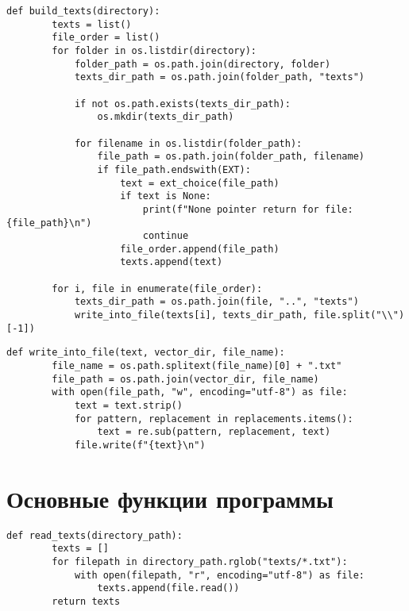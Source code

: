 \begin{lstlisting}[caption={Создание текстовых файлов для всех текстов}]
    def build_texts(directory):
        texts = list()
        file_order = list()
        for folder in os.listdir(directory):
            folder_path = os.path.join(directory, folder)
            texts_dir_path = os.path.join(folder_path, "texts")

            if not os.path.exists(texts_dir_path):
                os.mkdir(texts_dir_path)

            for filename in os.listdir(folder_path):
                file_path = os.path.join(folder_path, filename)
                if file_path.endswith(EXT):
                    text = ext_choice(file_path)
                    if text is None:
                        print(f"None pointer return for file: {file_path}\n")
                        continue
                    file_order.append(file_path)
                    texts.append(text)

        for i, file in enumerate(file_order):
            texts_dir_path = os.path.join(file, "..", "texts")
            write_into_file(texts[i], texts_dir_path, file.split("\\")[-1])
\end{lstlisting}

\begin{lstlisting}[caption={Запись текста в файл}]
    def write_into_file(text, vector_dir, file_name):
        file_name = os.path.splitext(file_name)[0] + ".txt"
        file_path = os.path.join(vector_dir, file_name)
        with open(file_path, "w", encoding="utf-8") as file:
            text = text.strip()
            for pattern, replacement in replacements.items():
                text = re.sub(pattern, replacement, text)
            file.write(f"{text}\n")
\end{lstlisting}

\section{Основные функции программы}

\begin{lstlisting}[caption={Чтение текстов в массив}]
    def read_texts(directory_path):
        texts = []
        for filepath in directory_path.rglob("texts/*.txt"):
            with open(filepath, "r", encoding="utf-8") as file:
                texts.append(file.read())
        return texts
\end{lstlisting}

